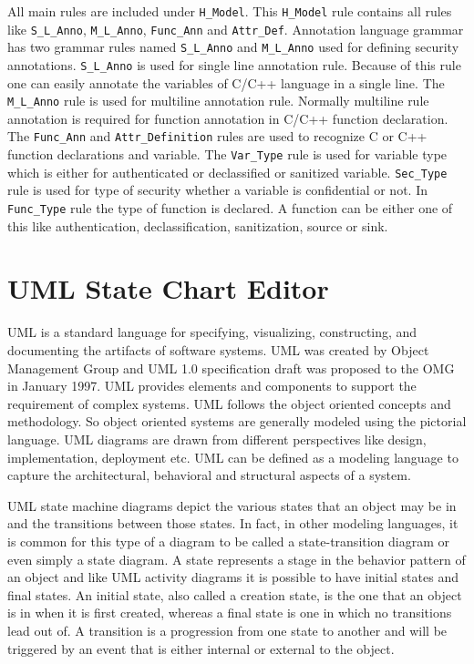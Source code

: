 All main rules are included under \texttt{H\_Model}. This  \texttt{H\_Model} rule contains all rules like \texttt{S\_L\_Anno}, \texttt{M\_L\_Anno}, \texttt{Func\_Ann} and \texttt{Attr\_Def}. Annotation language grammar has two grammar rules named \texttt{S\_L\_Anno} and \texttt{M\_L\_Anno} used for defining security annotations. \texttt{S\_L\_Anno} is used for single line annotation rule. Because of this rule one can easily annotate the variables of C/C++ language in a single line. The \texttt{M\_L\_Anno} rule is used for multiline annotation rule. Normally multiline rule annotation is required for function annotation in C/C++ function declaration. The \texttt{Func\_Ann} and \texttt{Attr\_Definition} rules are used to recognize C or C++ function declarations and variable. The \texttt{Var\_Type} rule is used for variable type which is either for authenticated or declassified or sanitized variable. \texttt{Sec\_Type} rule is used for type of security whether a variable is confidential or not. In \texttt{Func\_Type} rule the type of function is declared. A function can be either one of this like authentication, declassification, sanitization, source or sink.


\section{UML State Chart Editor}

UML is a standard language for specifying, visualizing, constructing, and documenting the artifacts of software systems. UML was created by Object Management Group and UML 1.0 specification draft was proposed to the OMG in January 1997. UML provides elements and components to support the requirement of complex systems. UML follows the object oriented concepts and methodology. So object oriented systems are generally modeled using the pictorial language. UML diagrams are drawn from different perspectives like design, implementation, deployment etc. UML can be defined as a modeling language to capture the architectural, behavioral and structural aspects of a system.

UML state machine diagrams depict the various states that an object may be in and the transitions between those states. In fact, in other modeling languages, it is common for this type of a diagram to be called a state-transition diagram or even simply a state diagram. A state represents a stage in the behavior pattern of an object and like UML activity diagrams it is possible to have initial states and final states. An initial state, also called a creation state, is the one that an object is in when it is first created, whereas a final state is one in which no transitions lead out of. A transition is a progression from one state to another and will be triggered by an event that is either internal or external to the object.

